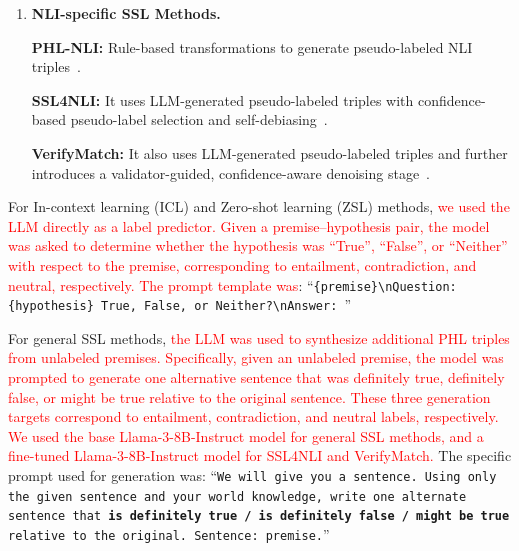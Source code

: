\documentclass[lettersize,journal]{IEEEtran}
\newcommand{\red}[1]{\textcolor{red}{#1}}
\begin{document}
\begin{enumerate}
	\textbf{FixMatch:} Pseudo-labeling weakly augmented data and training on strong augmentations~\cite{DBLP:conf/nips/SohnBCZZRCKL20}.
	
	\textbf{FlexMatch:} It extends FixMatch using adaptive confidence thresholds per class~\cite{DBLP:conf/nips/ZhangWHWWOS21}.
	
	\textbf{FreeMatch:} It extends FlexMatch using global/local thresholds with fairness-aware regularization~\cite{DBLP:conf/iclr/Wang0HHFW0SSRS023}.
	
	\textbf{SoftMatch:} It extends FixMatch using a Gaussian function to weight unlabeled samples based on their confidence~\cite{DBLP:conf/iclr/0102TFW0S0RS23}.
	
	\item \textbf{NLI-specific SSL Methods.}
	
	\textbf{PHL-NLI:} Rule-based transformations to generate pseudo-labeled NLI triples~\cite{DBLP:conf/acl/VarshneyBGB22}.
	
	\textbf{SSL4NLI:} It uses LLM-generated pseudo-labeled triples with confidence-based pseudo-label selection and self-debiasing~\cite{DBLP:conf/emnlp/SadatC22a}.
	
	\textbf{VerifyMatch:} It also uses LLM-generated pseudo-labeled triples and further introduces a validator-guided, confidence-aware denoising stage~\cite{DBLP:conf/emnlp/ParkC24}.
	
\end{enumerate}

For In-context learning (ICL) and Zero-shot learning (ZSL) methods, \red{we used the LLM directly as a label predictor. Given a premise--hypothesis pair, the model was asked to determine whether the hypothesis was “True”, “False”, or “Neither” with respect to the premise, corresponding to entailment, contradiction, and neutral, respectively. The prompt template was}: ``\texttt{\{premise\}\textbackslash nQuestion: \{hypothesis\} True, False, or Neither?\textbackslash nAnswer: }'' 

For general SSL methods, \red{the LLM was used to synthesize additional PHL triples from unlabeled premises. Specifically, given an unlabeled premise, the model was prompted to generate one alternative sentence that was definitely true, definitely false, or might be true relative to the original sentence. These three generation targets correspond to entailment, contradiction, and neutral labels, respectively. We used the base Llama-3-8B-Instruct model for general SSL methods, and a fine-tuned Llama-3-8B-Instruct model for SSL4NLI and VerifyMatch.} The specific prompt used for generation was: ``\texttt{We will give you a sentence. Using only the given sentence and your world knowledge, write one alternate sentence that \textbf{is definitely true / is definitely false / might be true} relative to the original. Sentence: premise.}'' 
\end{document}
